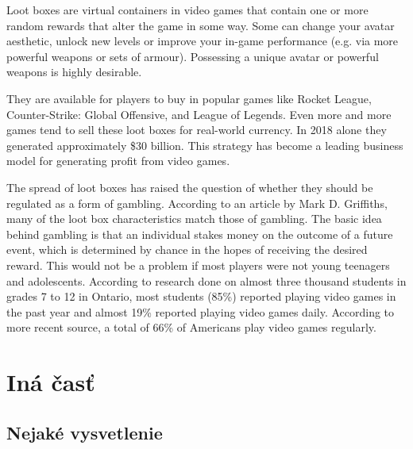 \documentclass[10pt,twoside,english,a4paper]{coursepaper}
\begin{document}
	Loot boxes are virtual containers in video games that contain one or more random rewards that alter the game in some way. Some can change your avatar aesthetic, unlock new levels or improve your in-game performance (e.g. via more powerful weapons or sets of armour). Possessing a unique avatar or powerful weapons is highly desirable. \par
	They are available for players to buy in popular games like Rocket League, Counter-Strike: Global Offensive, and League of Legends. Even more and more games tend to sell these loot boxes for real-world currency. In 2018 alone they generated approximately \$30 billion\cite{juniper:revenue}. This strategy has become a leading business model for generating profit from video games. \par
	The spread of loot boxes has raised the question of whether they should be regulated as a form of gambling. According to an article by Mark D. Griffiths, many of the loot box characteristics match those of gambling. The basic idea behind gambling is that an individual stakes money on the outcome of a future event, which is determined by chance in the hopes of receiving the desired reward. This would not be a problem if most players were not young teenagers and adolescents. 
	According to research\cite{springer:research} done on almost three thousand students in grades 7 to 12 in Ontario, most students (85\%) reported playing video games in the past year and almost 19\% reported playing video games daily. According to more recent source\cite{theesa:facts}, a total of 66\% of Americans play video games regularly. 
	




\section{Iná časť} \label{ina}




\subsection{Nejaké vysvetlenie} \label{ina:nejake}
\end{document}
